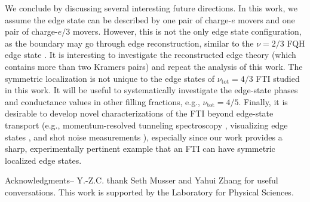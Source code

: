 \documentclass[aps,prx,amsmath,superscriptaddress,twocolumn,bibnotes,longbibliography,floatfix]{revtex4-2}
\begin{document}
	We conclude by discussing several interesting future directions.
	In this work, we assume the edge state can be described by one pair of charge-$e$ movers and one pair of charge-$e/3$ movers. However, this is not the only edge state configuration, as the boundary may go through edge reconstruction, similar to the $\nu=2/3$ FQH edge state \cite{WangJ2013,NosigliaC2018}. It is interesting to investigate the reconstructed edge theory (which contains more than two Kramers pairs) and repeat the analysis of this work. The symmetric localization is not unique to the edge states of $\nu_{\text{tot}}=4/3$ FTI studied in this work. It will be useful to systematically investigate the edge-state phases and conductance values in other filling fractions, e.g., $\nu_{\text{tot}}=4/5$.
	Finally, it is desirable to develop novel characterizations of the FTI beyond edge-state transport (e.g., momentum-resolved tunneling spectroscopy \cite{HuberM2005}, visualizing edge states \cite{YuJ2025}, and shot noise measurements \cite{TikhonovES2015}), especially since our work provides a sharp, experimentally pertinent example that an FTI can have symmetric localized edge states.

	\begin{acknowledgments}
		Acknowledgments-- Y.-Z.C. thank Seth Musser and Yahui Zhang for useful conversations.
		This work is supported by the Laboratory for Physical Sciences.
	\end{acknowledgments}
\end{document}
